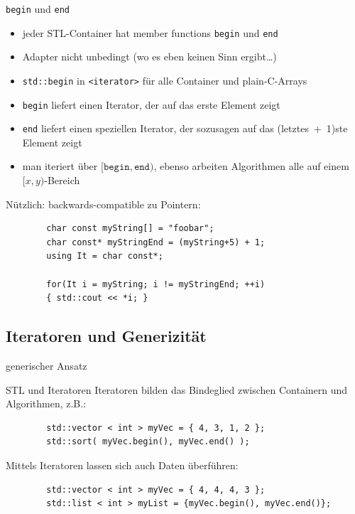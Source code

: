 \begin{frame}[fragile]{\texttt{begin} und \texttt{end}}
	\begin{itemize}
		\item jeder STL-Container hat member functions \texttt{begin} und \texttt{end}
		\item Adapter nicht unbedingt (wo es eben keinen Sinn ergibt\dots)
		\item \texttt{std::begin} in \texttt{<iterator>} für alle Container und plain-C-Arrays
		\item \texttt{begin} liefert einen Iterator, der auf das erste Element zeigt
		\item \texttt{end} liefert einen speziellen Iterator, der sozusagen auf das (letztes~+~1)ste Element zeigt
		\item man iteriert über $[\texttt{begin}, \texttt{end})$, ebenso arbeiten Algorithmen alle auf einem $[x, y)$-Bereich
	\end{itemize}
	
	\pause
	\vspace{1em}
	
	Nützlich: backwards-compatible zu Pointern:
	\begin{lstlisting}
		char const myString[] = "foobar";
		char const* myStringEnd = (myString+5) + 1;
		using It = char const*;
		
		for(It i = myString; i != myStringEnd; ++i)
		{ std::cout << *i; }
	\end{lstlisting}
\end{frame}


\subsection{Iteratoren und Generizität}

\begin{frame}[t]{generischer Ansatz}
	\onslide*<+> {  }
	\onslide<+-> {  }
\end{frame}

\begin{frame}[fragile]{STL und Iteratoren}
	Iteratoren bilden das Bindeglied zwischen Containern und Algorithmen, z.B.:
	\begin{lstlisting}
		std::vector < int > myVec = { 4, 3, 1, 2 };
		std::sort( myVec.begin(), myVec.end() );
	\end{lstlisting}
	
	\pause
	\vspace{2em}
	
	Mittels Iteratoren lassen sich auch Daten überführen:
	\begin{lstlisting}
		std::vector < int > myVec = { 4, 4, 4, 3 };
		std::list < int > myList = {myVec.begin(), myVec.end()};
	\end{lstlisting}
\end{frame}


